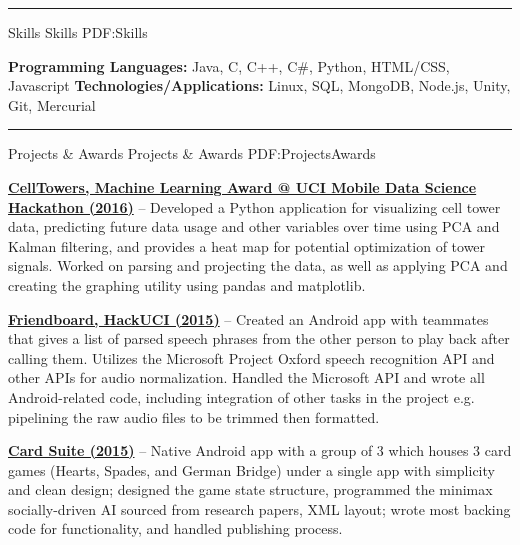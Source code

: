 \documentclass[letterpaper,MMMyyyy,nonstopmode]{simpleresumecv}
\begin{document}
\begin{Body}
\hrule


\Section
{Skills}
{Skills}
{PDF:Skills}

\begin{flushleft}
\textbf{Programming Languages:} Java, C, C++, C\#, Python, HTML/CSS, Javascript
\textbf{Technologies/Applications:} Linux, SQL, MongoDB, Node.js, Unity, Git, Mercurial\newline
\end{flushleft}

\hrule


\Section
{Projects \& Awards}
{Projects \& Awards}
{PDF:ProjectsAwards}

\Entry
\BulletItem
\href{https://github.com/trizzle21/Datathon2016}
{\textbf{CellTowers, Machine Learning Award @ UCI Mobile Data Science Hackathon (2016)}} -- Developed a Python application for visualizing cell tower data, predicting future data usage and other variables over time using PCA and Kalman filtering, and provides a heat map for potential optimization of tower signals. Worked on parsing and projecting the data, as well as applying PCA and creating the graphing utility using pandas and matplotlib.\newline

\Entry
\BulletItem
\href{https://github.com/SVT125/HackUCI2015}
{\textbf{Friendboard, HackUCI (2015)}} -- Created an Android app with teammates that gives a list of parsed speech phrases from the other person to play back after calling them. Utilizes the Microsoft Project Oxford speech recognition API and other APIs for audio normalization. Handled the Microsoft API and wrote all Android-related code, including integration of other tasks in the project e.g. pipelining the raw audio files to be trimmed then formatted.\newline

\Entry
\BulletItem
\href{https://github.com/SVT125/GermanBridge}
{\textbf{Card Suite (2015)}} -- Native Android app with a group of 3 which houses 3 card games (Hearts, Spades, and German Bridge) under a single app with simplicity and clean design; designed the game state structure, programmed the minimax socially-driven AI sourced from research papers, XML layout; wrote most backing code for functionality, and handled publishing process.\newline


\end{Body}
\end{document}

